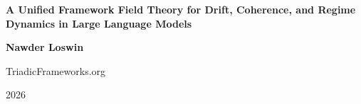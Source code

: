 \documentclass[11pt]{article}
\begin{document}
\begin{titlepage}
    \centering

    {\Large \textbf{A Unified Framework Field Theory for Drift, Coherence, and Regime Dynamics in Large Language Models}\par}
    \vspace{1.5cm}

    {\large \textbf{Nawder Loswin}\par}
    {\large TriadicFrameworks.org\par}
    \vspace{1cm}

    {\large 2026\par}
    \vfill

    \begin{abstract}
    Large Language Models (LLMs) exhibit systematic behaviors---drift branching, coherence waves, framework collisions, and regime-dependent reasoning---that remain poorly characterized in existing literature. Framework Field Theory (FFT) provides a structural model for these phenomena by treating reasoning as motion within a triadic substrate composed of operators, regimes, and coherence fields. This paper introduces FFT's core definitions, presents eight falsifiable predictions, demonstrates reproducible simulations using existing LLMs, outlines minimal engineering artifacts derived from the theory, and situates FFT within established traditions in information theory, systems theory, cognitive science, and AI alignment.
    \end{abstract}

    \vfill
\end{titlepage}
\end{document}
